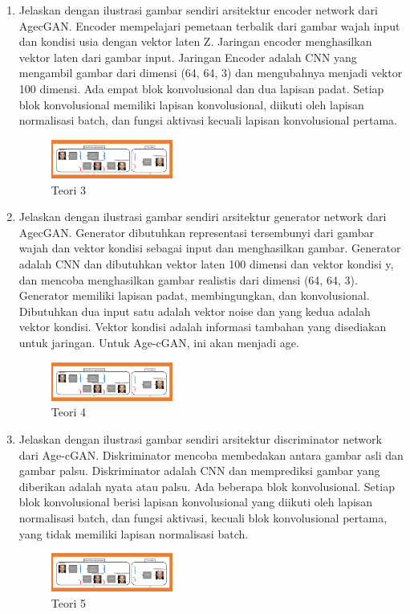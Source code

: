 \begin{enumerate}
	\item Jelaskan dengan ilustrasi gambar sendiri arsitektur encoder network dari AgecGAN.
	\hfill\break
	Encoder mempelajari pemetaan terbalik dari gambar wajah input dan kondisi usia dengan vektor laten Z. Jaringan encoder menghasilkan vektor laten dari gambar input. Jaringan Encoder adalah CNN yang mengambil gambar dari dimensi (64, 64, 3) dan mengubahnya menjadi vektor 100 dimensi. Ada empat blok konvolusional dan dua lapisan padat. Setiap blok konvolusional memiliki lapisan konvolusional, diikuti oleh lapisan normalisasi batch, dan fungsi aktivasi kecuali lapisan konvolusional pertama.
	\begin{figure}[H]
		\includegraphics[width=4cm]{figures/1164013/9/teori345.png}
		\centering
		\caption{Teori 3}
	\end{figure}

	\item Jelaskan dengan ilustrasi gambar sendiri arsitektur generator network dari AgecGAN.
	\hfill\break
	Generator dibutuhkan representasi tersembunyi dari gambar wajah dan vektor kondisi sebagai input dan menghasilkan gambar. Generator adalah CNN dan dibutuhkan vektor laten 100 dimensi dan vektor kondisi y, dan mencoba menghasilkan gambar realistis dari dimensi (64, 64, 3). Generator memiliki lapisan padat, membingungkan, dan konvolusional. Dibutuhkan dua input satu adalah vektor noise dan yang kedua adalah vektor kondisi. Vektor kondisi adalah informasi tambahan yang disediakan untuk jaringan. Untuk Age-cGAN, ini akan menjadi age.
	\begin{figure}[H]
		\includegraphics[width=4cm]{figures/1164013/9/teori345.png}
		\centering
		\caption{Teori 4}
	\end{figure}

	\item Jelaskan dengan ilustrasi gambar sendiri arsitektur discriminator network dari Age-cGAN.
	\hfill\break
	Diskriminator mencoba membedakan antara gambar asli dan gambar palsu. Diskriminator adalah CNN dan memprediksi gambar yang diberikan adalah nyata atau palsu. Ada beberapa blok konvolusional. Setiap blok konvolusional berisi lapisan konvolusional yang diikuti oleh lapisan normalisasi batch, dan fungsi aktivasi, kecuali blok konvolusional pertama, yang tidak memiliki lapisan normalisasi batch.
	\begin{figure}[H]
		\includegraphics[width=4cm]{figures/1164013/9/teori345.png}
		\centering
		\caption{Teori 5}
	\end{figure}


\end{enumerate}
